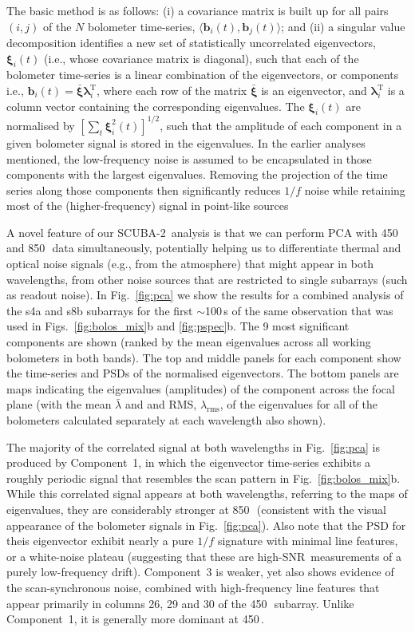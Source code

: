 \documentclass[useAMS,usenatbib,nofootinbib]{mn2e}
\newcommand{\snr}{SNR}
\newcommand{\scuba}{SCUBA-2}
\newcommand{\rms}{RMS}
\begin{document}
The basic method is as follows: (i) a covariance matrix is built up
for all pairs $(i,j)$ of the $N$ bolometer time-series,
$\langle\mathbf{b}_i(t),\mathbf{b}_j(t)\rangle$; and (ii) a singular
value decomposition identifies a new set of statistically uncorrelated
eigenvectors, $\mathbf{\xi}_i(t)$ (i.e., whose covariance matrix is
diagonal), such that each of the bolometer time-series is a linear
combination of the eigenvectors, or components i.e., $\mathbf{b}_i(t)
= \bar{\mathbf{\xi}} \mathbf{\lambda}_i^\mathrm{T}$, where each row of
the matrix $\bar{\mathbf{\xi}}$ is an eigenvector, and
$\mathbf{\lambda}_i^\mathrm{T}$ is a column vector containing the
corresponding eigenvalues. The $\mathbf{\xi}_i(t)$ are normalised by
$[\sum_t \mathbf{\xi}_i^2(t)]^{1/2}$, such that the amplitude of each
component in a given bolometer signal is stored in the eigenvalues. In
the earlier analyses mentioned, the low-frequency noise is assumed to
be encapsulated in those components with the largest
eigenvalues. Removing the projection of the time series along those
components then significantly reduces $1/f$ noise while retaining most
of the (higher-frequency) signal in point-like sources

A novel feature of our \scuba\ analysis is that we can perform PCA
with 450 and 850\,\micron\ data simultaneously, potentially helping us
to differentiate thermal and optical noise signals (e.g., from the
atmosphere) that might appear in both wavelengths, from other noise
sources that are restricted to single subarrays (such as readout
noise). In Fig.~\ref{fig:pca} we show the results for a combined
analysis of the s4a and s8b subarrays for the first $\sim$100\,s of
the same observation that was used in Figs.~\ref{fig:bolos_mix}b and
\ref{fig:pspec}b. The 9 most significant components are shown (ranked
by the mean eigenvalues across all working bolometers in both
bands). The top and middle panels for each component show the
time-series and PSDs of the normalised eigenvectors. The bottom panels
are maps indicating the eigenvalues (amplitudes) of the component
across the focal plane (with the mean $\bar{\lambda}$ and and \rms,
$\lambda_\mathrm{rms}$, of the eigenvalues for all of the bolometers
calculated separately at each wavelength also shown).

The majority of the correlated signal at both wavelengths in
Fig.~\ref{fig:pca} is produced by Component~1, in which the
eigenvector time-series exhibits a roughly periodic signal that
resembles the scan pattern in Fig.~\ref{fig:bolos_mix}b. While this
correlated signal appears at both wavelengths, referring to the maps
of eigenvalues, they are considerably stronger at 850\,\micron\
(consistent with the visual appearance of the bolometer signals in
Fig.~\ref{fig:pca}). Also note that the PSD for theis eigenvector
exhibit nearly a pure $1/f$ signature with minimal line features, or a
white-noise plateau (suggesting that these are high-\snr\ measurements
of a purely low-frequency drift). Component~3 is weaker, yet also
shows evidence of the scan-synchronous noise, combined with
high-frequency line features that appear primarily in columns 26, 29
and 30 of the 450\,\micron\ subarray. Unlike Component~1, it is
generally more dominant at 450\,\micron.
\end{document}
